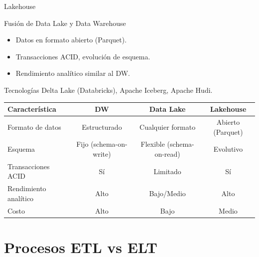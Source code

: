 \documentclass[aspectratio=169, 10pt, xcolor=table]{beamer}
\begin{document}
\begin{frame}{Lakehouse}
    \begin{block}{Fusión de Data Lake y Data Warehouse}
        \begin{itemize}
            \item Datos en formato abierto (Parquet).
            \item Transacciones ACID, evolución de esquema.
            \item Rendimiento analítico similar al DW.
        \end{itemize}
    \end{block}
    \begin{exampleblock}{Tecnologías}
        Delta Lake (Databricks), Apache Iceberg, Apache Hudi.
    \end{exampleblock}
    \begin{table}
        \centering
        \begin{tabular}{l|c|c|c}
            \toprule
            Característica & DW & Data Lake & Lakehouse \\
            \midrule
            Formato de datos & Estructurado & Cualquier formato & Abierto (Parquet) \\
            Esquema & Fijo (schema-on-write) & Flexible (schema-on-read) & Evolutivo \\
            Transacciones ACID & Sí & Limitado & Sí \\
            Rendimiento analítico & Alto & Bajo/Medio & Alto \\
            Costo & Alto & Bajo & Medio \\
            \bottomrule
        \end{tabular}
    \end{table}
\end{frame}

\section{Procesos ETL vs ELT}
\end{document}
